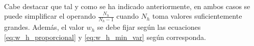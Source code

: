 \documentclass{article}
\begin{document}
  \paragraph{}
  Cabe destacar que tal y como se ha indicado anteriormente, en ambos casos se puede simplificar el operando $\frac{N_h}{N_h-1}$ cuando $N_h$ toma valores suficientemente grandes. Además, el valor $w_h$ se debe fijar según las ecuaciones \eqref{eq:w_h_proporcional} y \eqref{eq:w_h_min_var} según corresponda.


  \nocite{muest2017}
  \nocite{sarndal2003model}

  
  
\end{document}
